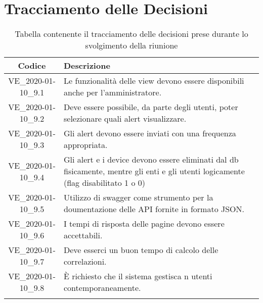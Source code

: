 \section*{Tracciamento delle Decisioni}

\begin{center}
	\begin{longtable}{|c|p{12.25cm}|}
	\hline
	\rowcolor{lighter-grayer}
	\textbf{Codice} & \textbf{Descrizione} \\
	\hline
	\endfirsthead
	
	\hline
	VE\_2020-01-10\_9.1 & Le funzionalità delle view devono essere disponibili anche per l'amministratore. \\
	\hline
	VE\_2020-01-10\_9.2 & Deve essere possibile, da parte degli utenti, poter selezionare quali alert visualizzare. \\
	\hline
	VE\_2020-01-10\_9.3 & Gli alert devono essere inviati con una frequenza appropriata. \\
	\hline
	VE\_2020-01-10\_9.4 & Gli alert e i device devono essere eliminati dal db fisicamente, mentre gli enti e gli utenti logicamente (flag disabilitato 1 o 0) \\
	\hline
	VE\_2020-01-10\_9.5 & Utilizzo di swagger come strumento per la doumentazione delle API fornite in formato JSON. \\
	\hline
	VE\_2020-01-10\_9.6 & I tempi di risposta delle pagine devono essere accettabili. \\
	\hline
	VE\_2020-01-10\_9.7 & Deve esserci un buon tempo di calcolo delle correlazioni. \\
	\hline
	VE\_2020-01-10\_9.8 & È richiesto che il sistema gestisca n utenti contemporaneamente. \\
	\hline
	\caption{Tabella contenente il tracciamento delle decisioni prese durante lo svolgimento della riunione}
	\end{longtable}
\end{center}